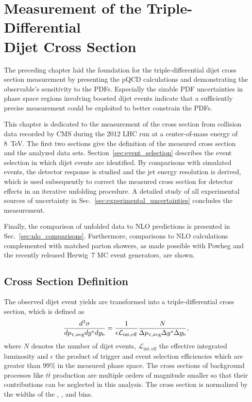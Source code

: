 
\chapter[Measurement of the Triple-Differential Dijet Cross Section]{Measurement
of the Triple-Differential\\ Dijet Cross Section}
\label{sec:measurement}

The preceding chapter laid the foundation for the triple-differential dijet
cross section measurement by presenting the pQCD calculations and
demonstrating the observable's sensitivity to the PDFs. Especially the sizable
PDF uncertainties in phase space regions involving boosted dijet events indicate
that a sufficiently precise measurement could be exploited to better constrain
the PDFs. 

This chapter is dedicated to the measurement of the cross section from collision
data recorded by CMS during the 2012 LHC run at a center-of-mass energy of
\SI{8}{\TeV}. The first two sections give the definition of the measured cross
section and the analyzed data sets. Section~\ref{sec:event_selection} describes the
event selection in which dijet events are identified. By comparisons with simulated
events, the detector response is studied and the jet energy resolution is
derived, which is used subsequently to correct the measured cross section for detector
effects in an iterative unfolding procedure. A detailed study of all
experimental sources of uncertainty in Sec.~\ref{sec:experimental_uncertainties}
concludes the measurement.

Finally, the comparison of unfolded data to NLO predictions is presented in
Sec.~\ref{sec:nlo_comparisons}. Furthermore, comparisons to NLO calculations
complemented with matched parton showers, as made possible with Powheg and the
recently released Herwig~7 MC event generators, are shown.

\section{Cross Section Definition}

The observed dijet event yields are transformed into a triple-differential
cross section, which is defined as
%
\begin{equation*}
    \frac{d^3 \sigma}{d \ptavg d \ystar d \yboost} = \frac{1}{\epsilon
        \mathcal{L}_{\mathrm{int, eff}}} \frac{N}{\Delta \ptavg \Delta \ystar
        \Delta \yboost},
\end{equation*}
%
where $N$ denotes the number of dijet events, $\mathcal{L}_{\mathrm{int, eff}}$
the effective integrated luminosity and $\epsilon$ the product of trigger and
event selection efficiencies which are greater than 99\% in the measured phase
space. The cross sections of background processes like $t\bar t$ production are
multiple orders of magnitude smaller so that their contributions can be
neglected in this analysis. The cross section is normalized by the widths of
the \ptavg, \ystar, and \yboost bins. 

